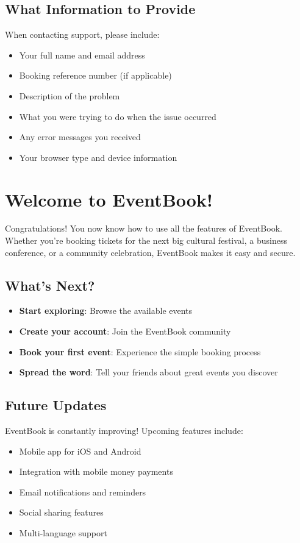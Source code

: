 \documentclass[12pt,a4paper]{article}
\begin{document}
\subsection{What Information to Provide}

When contacting support, please include:
\begin{itemize}
    \item Your full name and email address
    \item Booking reference number (if applicable)
    \item Description of the problem
    \item What you were trying to do when the issue occurred
    \item Any error messages you received
    \item Your browser type and device information
\end{itemize}

\section{Welcome to EventBook! 🎊}

Congratulations! You now know how to use all the features of EventBook. Whether you're booking tickets for the next big cultural festival, a business conference, or a community celebration, EventBook makes it easy and secure.

\subsection{What's Next?}

\begin{itemize}
    \item \textbf{Start exploring}: Browse the available events
    \item \textbf{Create your account}: Join the EventBook community
    \item \textbf{Book your first event}: Experience the simple booking process
    \item \textbf{Spread the word}: Tell your friends about great events you discover
\end{itemize}

\subsection{Future Updates}

EventBook is constantly improving! Upcoming features include:
\begin{itemize}
    \item Mobile app for iOS and Android
    \item Integration with mobile money payments
    \item Email notifications and reminders
    \item Social sharing features
    \item Multi-language support
\end{itemize}
\end{document}
